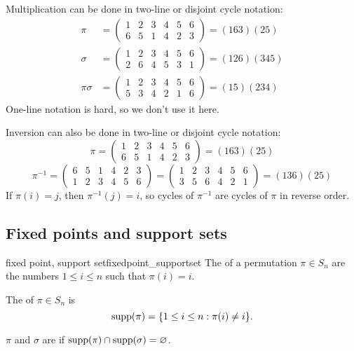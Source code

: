 \documentclass[12pt,letterpaper]{report}
\begin{document}
Multiplication can be done in two-line or disjoint cycle notation:
\begin{align*}
  \pi &= \begin{pmatrix}
    1 & 2 & 3 & 4 & 5 & 6 \\
    6 & 5 & 1 & 4 & 2 & 3
  \end{pmatrix} = (163)(25) \\
  \sigma &= \begin{pmatrix}
    1 & 2 & 3 & 4 & 5 & 6 \\
    2 & 6 & 4 & 5 & 3 & 1
  \end{pmatrix} = (126)(345) \\
  \pi\sigma &= \begin{pmatrix}
    1 & 2 & 3 & 4 & 5 & 6 \\
    5 & 3 & 4 & 2 & 1 & 6
  \end{pmatrix} = (15)(234)
\end{align*}
One-line notation is hard, so we don't use it here.

Inversion can also be done in two-line or disjoint cycle notation:
\[
  \pi = \begin{pmatrix}
    1 & 2 & 3 & 4 & 5 & 6 \\
    6 & 5 & 1 & 4 & 2 & 3
  \end{pmatrix} = (163)(25)
\]
\[
  \pi^{-1} = \begin{pmatrix}
    6 & 5 & 1 & 4 & 2 & 3 \\
    1 & 2 & 3 & 4 & 5 & 6
  \end{pmatrix} = \begin{pmatrix}
    1 & 2 & 3 & 4 & 5 & 6 \\
    3 & 5 & 6 & 4 & 2 & 1
  \end{pmatrix} = (136)(25)
\]
If $\pi(i) = j$, then $\pi^{-1}(j) = i$, so cycles of $\pi^{-1}$ are cycles of $\pi$ in reverse
order.

\pagebreak
\subsection{Fixed points and support sets}

\begin{defn}{fixed point, support set}{fixedpoint_supportset}
  The  of a permutation $\pi \in S_n$ are the numbers $1 \leq i \leq n$ such
  that $\pi(i) = i$.

  The  of $\pi \in S_n$ is
  \[ \operatorname{supp}(\pi) = \{ 1 \leq i \leq n : \pi(i) \neq i \}. \]

  $\pi$ and $\sigma$ are  if $\operatorname{supp}(\pi) \cap \operatorname{supp}(\sigma) = \varnothing$.
\end{defn}
\end{document}
